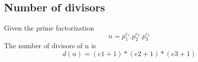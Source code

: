 \subsection{Number of divisors}
Given the prime factorization $$ n = p_1^{e_1} . p_2^{e_2} . p_3^{e_3} $$
The number of divisors of n is
$$ d(n) = (e1 + 1) * (e2 + 1) * (e3 + 1) $$
